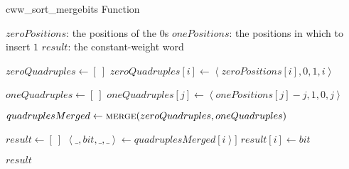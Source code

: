             \begin{frame}[containsverbatim]{\cwwviainsertionseriesfunctionframe}
                \begingroup
                    \makeatletter
                    \renewcommand{\alglinenumber}[1]{\tiny#1}
                    \makeatother
                    \begin{algorithm}[H]
                        \tiny
                        \caption{cww\_sort\_mergebits Function} \label{cww_via_mergebits function}
                        \begin{multicols}{2}
                            \begin{algorithmic}[1]
                                \Require 
                                    \Statex $zeroPositions$: the positions of the $0$s
                                    \Statex $onePositions$: the positions in which to insert $1$
                                \Ensure
                                    \Statex $result$: the constant-weight word
                                \Statex
                
                                    \State $zeroQuadruples \gets \left[\ \right]$
                                        \State $zeroQuadruples{\left[i\right]} \gets \left<zeroPositions{\left[i\right]}, 0, 1, i\right>$
                                    \EndFor
    
                                    \State $oneQuadruples \gets \left[\ \right]$
                                        \State $oneQuadruples{\left[j\right]} \gets \left<onePositions{\left[j\right]} - j, 1, 0, j\right>$
                                    \EndFor
    
                                    \State $quadruplesMerged \gets \Call{merge}{zeroQuadruples, oneQuadruples}$
    
                                    \State $result \gets \left[\ \right]$
                                        \State $\left<\_, bit, \_, \_\right> \gets quadruplesMerged{\left[i\right>]}$
                                        \State $result{\left[i\right]} \gets bit$
                                    \EndFor
        
                                    \State \Return $result$
                                \EndFunction
                            \end{algorithmic}
                        \end{multicols}
                    \end{algorithm}
                \endgroup
            \end{frame}

